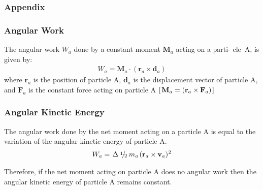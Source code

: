\documentclass[10pt]{article}
\newcommand{\mM}{m}
\newcommand{\mW}{W}
\newcommand{\ra}{_a}
\newcommand{\vR}{\mathbf{r}}
\newcommand{\vV}{\mathbf{v}}
\newcommand{\vD}{\mathbf{d}}
\newcommand{\vF}{\mathbf{F}}
\newcommand{\vM}{\mathbf{M}}
\newcommand{\med}{\raise.5ex\hbox{$\scriptstyle 1$}\kern-.15em/\kern-.15em\lower.25ex\hbox{$\scriptstyle 2$}}
\begin{document}
\newpage

{\centering\subsubsection*{Appendix}}

\vspace{+0.75em}

{\centering\subsubsection*{Angular Work}}

\vspace{+0.75em}

\par The angular work $\mW\ra$ done by a constant moment $\vM\ra$ acting on a parti- \hbox {cle A}, is given by:
\vspace{-0.45em}
\begin{eqnarray*}
\mW\ra = \vM\ra \cdot (\vR\ra \times \vD\ra)
\end{eqnarray*}
\noindent where $\vR\ra$ is the position of particle A, $\vD\ra$ is the displacement vector of particle A, and $\vF\ra$ is the constant force acting on particle A $[\hspace{+0.12em} \vM\ra = (\vR\ra \times \vF\ra) \hspace{+0.12em}]$

\vspace{+1.50em}

{\centering\subsubsection*{Angular Kinetic Energy}}

\vspace{+0.75em}

\par The angular work done by the net moment acting on a particle A is equal to the variation of the angular kinetic energy of particle A.
\vspace{-0.15em}
\begin{eqnarray*}
\mW\ra = \hspace{+0.09em} \Delta \hspace{+0.24em} \med \hspace{+0.24em} \mM\ra \hspace{+0.12em} (\vR\ra \times \vV\ra)^{\hspace{+0.03em} 2}
\end{eqnarray*}
\par Therefore, if the net moment acting on particle A does no angular work then the angular kinetic energy of particle A remains constant.
\end{document}
